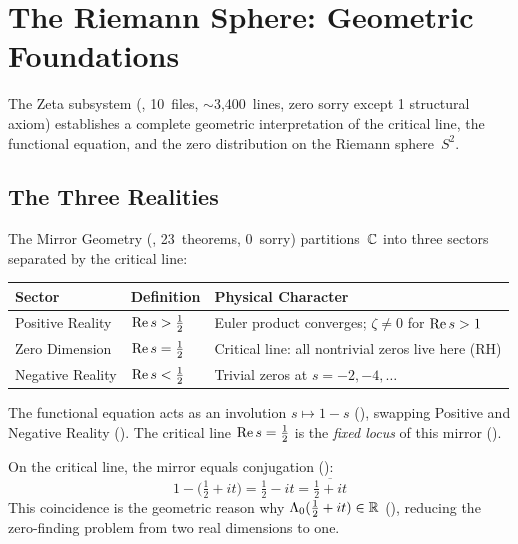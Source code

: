 \section{The Riemann Sphere: Geometric Foundations}
\label{sec:riemann-sphere}

The Zeta subsystem (, 10~files, $\sim$3{,}400~lines,
zero sorry except 1 structural axiom) establishes a complete
geometric interpretation of the critical line, the functional equation,
and the zero distribution on the Riemann sphere~$S^2$.

\subsection{The Three Realities}

The Mirror Geometry (, 23~theorems, 0~sorry)
partitions~$\mathbb{C}$ into three sectors separated by the critical line:

\begin{center}
\small
\begin{tabular}{@{}lll@{}}
\toprule
\textbf{Sector} & \textbf{Definition} & \textbf{Physical Character} \\
\midrule
Positive Reality & $\operatorname{Re} s > \tfrac{1}{2}$ & Euler product converges; $\zeta \neq 0$ for $\operatorname{Re} s > 1$ \\
Zero Dimension   & $\operatorname{Re} s = \tfrac{1}{2}$ & Critical line: all nontrivial zeros live here (RH) \\
Negative Reality & $\operatorname{Re} s < \tfrac{1}{2}$ & Trivial zeros at $s = -2, -4, \ldots$ \\
\bottomrule
\end{tabular}
\end{center}

\begin{principle}
The functional equation acts as an involution
$s \mapsto 1 - s$ (), swapping Positive
and Negative Reality (). The critical line
$\operatorname{Re} s = \tfrac{1}{2}$ is the \emph{fixed locus} of this mirror
().

On the critical line, the mirror equals conjugation
():
\[
  1 - \bigl(\tfrac{1}{2} + it\bigr) = \tfrac{1}{2} - it
  = \overline{\tfrac{1}{2} + it}
\]
This coincidence is the geometric reason why $\Lambda_0(\tfrac{1}{2}+it) \in \mathbb{R}$
(), reducing the zero-finding problem
from two real dimensions to one.
\end{principle}

